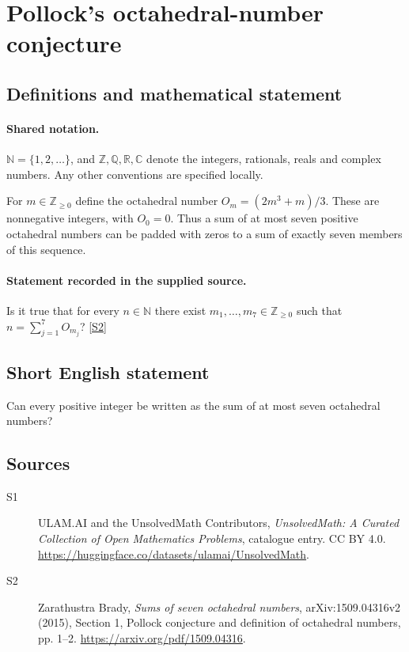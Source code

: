 \documentclass[11pt]{article}
\newcommand{\sref}[2]{\hyperlink{source:#1:#2}{[S#2]}}
\begin{document}
\section{Pollock's octahedral-number conjecture}\label{statement}

\subsection{Definitions and mathematical statement}

\paragraph{Shared notation.}$\mathbb N=\{1,2,\ldots\}$, and $\mathbb Z,\mathbb Q,\mathbb R,\mathbb C$ denote the integers, rationals, reals and complex numbers. Any other conventions are specified locally.


For $m\in\mathbb Z_{\ge0}$ define the octahedral number $O_m=(2m^3+m)/3$. These are nonnegative integers, with $O_0=0$. Thus a sum of at most seven positive octahedral numbers can be padded with zeros to a sum of exactly seven members of this sequence.
\paragraph{Statement recorded in the supplied source.}
Is it true that for every $n\in\mathbb N$ there exist $m_1,\ldots,m_7\in\mathbb Z_{\ge0}$ such that $n=\sum_{j=1}^7 O_{m_j}$? \sref{statement}{2}
\subsection{Short English statement}
Can every positive integer be written as the sum of at most seven octahedral numbers?
\subsection{Sources}
\begin{description}
\item[\hypertarget{source:statement:1}{S1}] ULAM.AI and the UnsolvedMath Contributors, \emph{UnsolvedMath: A Curated Collection of Open Mathematics Problems}, catalogue entry. CC BY 4.0. \url{https://huggingface.co/datasets/ulamai/UnsolvedMath}.
\item[\hypertarget{source:statement:2}{S2}] Zarathustra Brady, \emph{Sums of seven octahedral numbers}, arXiv:1509.04316v2 (2015), Section 1, Pollock conjecture and definition of octahedral numbers, pp. 1--2. \url{https://arxiv.org/pdf/1509.04316}.
\end{description}
\label{end:statement}
\end{document}
